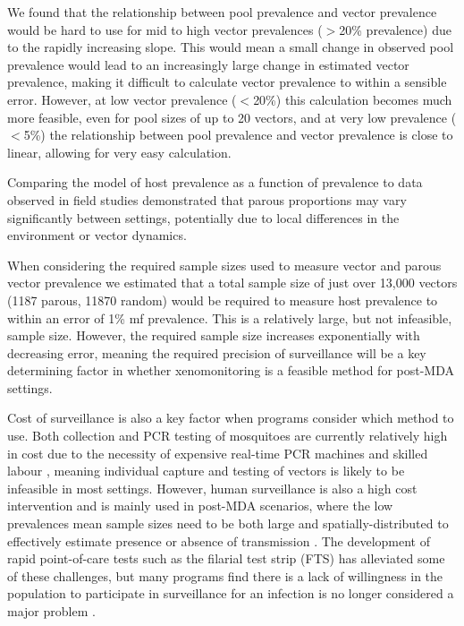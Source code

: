 We found that the relationship between pool prevalence and vector prevalence would be hard to use for mid to high vector prevalences ($>$20\% prevalence) due to the rapidly increasing slope. This would mean a small change in observed pool prevalence would lead to an increasingly large change in estimated vector prevalence, making it difficult to calculate vector prevalence to within a sensible error. However, at low vector prevalence ($<$20\%) this calculation becomes much more feasible, even for pool sizes of up to 20 vectors, and at very low prevalence ($<$5\%) the relationship between pool prevalence and vector prevalence is close to linear, allowing for very easy calculation.

Comparing the model of host prevalence as a function of prevalence to data observed in field studies demonstrated that parous proportions may vary significantly between settings, potentially due to local differences in the environment or vector dynamics.

When considering the required sample sizes used to measure vector and parous vector prevalence we estimated that a total sample size of just over 13,000 vectors (1187 parous, 11870 random) would be required to measure host prevalence to within an error of 1\% mf prevalence. This is a relatively large, but not infeasible, sample size. However, the required sample size increases exponentially with decreasing error, meaning the required precision of surveillance will be a key determining factor in whether xenomonitoring is a feasible method for post-MDA settings.

Cost of surveillance is also a key factor when programs consider which method to use. Both collection and PCR testing of mosquitoes are currently relatively high in cost due to the necessity of expensive real-time PCR machines \cite{Goodman2003} and skilled labour \cite{Okorie2016}, meaning individual capture and testing of vectors is likely to be infeasible in most settings. However, human surveillance is also a high cost intervention and is mainly used in post-MDA scenarios, where the low prevalences mean sample sizes need to be both large and spatially-distributed to effectively estimate presence or absence of transmission \cite{WHO2011}. The development of rapid point-of-care tests such as the filarial test strip (FTS) has alleviated some of these challenges, but many programs find there is a lack of willingness in the population to participate in surveillance for an infection is no longer considered a major problem \cite{Pilotte2016}.

